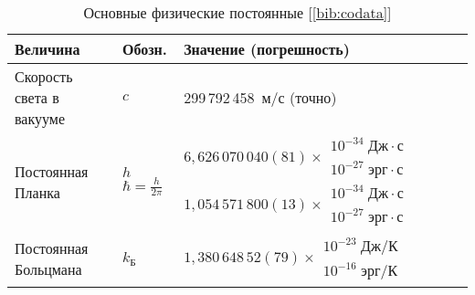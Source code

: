 \newcommand*{\z}{\phantom{0}}
\newcommand*{\zz}{\phantom{00}}

\pagestyle{empty}
\begin{labsupplement}
\begin{longtable}{p{46mm}>{\centering}p{14mm}p{45mm}}
\caption{Основные физические постоянные [\ref{bib:codata}]}\\
\toprule[1pt]
\textbf{Величина}     & \textbf{Обозн.} & \textbf{Значение (погрешность)} \\
\midrule[1pt]
Скорость света в вакууме
                      & $c$
                      & 299\,792\,458~м/с (точно)                         \\ \hline
Постоянная Планка     & \hfil$h$\newline \newline
                        $\hbar=\frac{h}{2\pi}$
                      & $6,626\,070\,040(81)\times \!\!
                            \begin{array}{l}
                                10^{-34}\;Дж\cdot с \\[-2pt]
                                10^{-27}\;эрг\cdot с
                            \end{array} $ \newline
                        $1,054\,571\,800(13)\times \!\!
                            \begin{array}{l}
                                10^{-34}\;Дж\cdot с \\[-2pt]
                                10^{-27}\;эрг\cdot с
                            \end{array}$                                 \\ \hline
Постоянная Больцмана  & $k_{Б}$
                      & $1,380\,648\,52(79)\times \!\!
                        \begin{array}{l}
                            10^{-23}\;Дж/К \\[-2pt]
                            10^{-16}\;эрг/К
                        \end{array}$                                    \\ \hline

\end{longtable}
\end{labsupplement}
